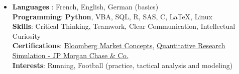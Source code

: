 \documentclass[A4,11pt]{article}
\begin{document}
\begin{itemize}[leftmargin=0.5cm, label={}]
  \item[] \small
    \textbf{Languages} : French, English, German (basics) \\
    \vspace{0.4em}
    \textbf{Programming}: \textbf{Python}, VBA, SQL, R, SAS, C, \LaTeX, Linux \\
    \vspace{0.4em}
   \textbf{Skills}: Critical Thinking, Teamwork, Clear Communication, Intellectual Curiosity \\
\vspace{0.4em}
\textbf{Certifications}:
\href{https://portal.bloombergforeducation.com/certificates/sTDGueRo1rsbq1cJ59J9fqM4}{ Bloomberg Market Concepts}, \href{https://www.theforage.com/completion-certificates/Sj7temL583QAYpHXD/bWqaecPDbYAwSDqJy_Sj7temL583QAYpHXD_6953b6c1beda68c473e0e9a6_1767175965154_completion_certificate.pdf}{ Quantitative Research Simulation - JP Morgan Chase \& Co. }  \\
 \vspace{0.4em}
 \textbf{Interests}: Running, Football (practice, tactical analysis and modeling)
\end{itemize} 

    
\end{document}
